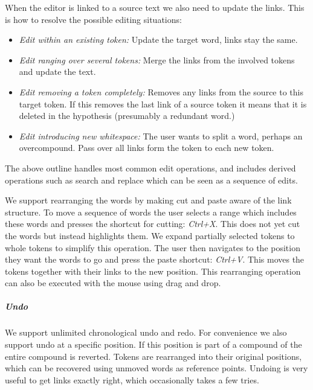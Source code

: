 \documentclass[10pt, a4paper]{article}
\begin{document}
When the editor is linked to a source text we also need to update the links.
This is how to resolve the possible editing situations:

\begin{itemize}

\item {\it Edit within an existing token:}
Update the target word, links stay the same.

\item {\it Edit ranging over several tokens:}
Merge the links from the involved tokens and update the text.

\item {\it Edit removing a token completely:}
Removes any links from the source to this target token.
If this removes the last link of a source token it means that
it is deleted in the hypothesis (presumably a redundant word.)

\item {\it Edit introducing new whitespace:}
The user wants to split a word, perhaps an overcompound.
Pass over all links form the token to each new token.

\end{itemize}

The above outline handles most common edit operations, and includes derived
operations such as search and replace which can be seen as a sequence of edits.

We support rearranging the words by making cut and paste aware of the link
structure. To move a sequence of words the user selects a range
which includes these words and presses the shortcut for cutting: {\it Ctrl+X}.
This does not yet cut the words but instead highlights them. We expand partially
selected tokens to whole tokens to simplify this operation. The user then
navigates to the position they want the words to go and press the paste
shortcut: {\it Ctrl+V}.
This moves the tokens together with their links to the new position.
This rearranging operation can also be executed with the mouse using drag and drop.

\subparagraph{Undo} We support unlimited chronological undo and redo.
For convenience we also support undo at a specific position. %
If this position is part of a compound of the entire compound is reverted.
Tokens are rearranged into their original positions, which
can be recovered using unmoved words as reference points.
Undoing is very useful to get links exactly right, which occasionally takes a
few tries.
\end{document}
